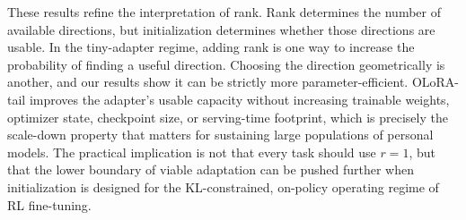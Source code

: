 \documentclass{llmxive}
\begin{document}
  These results refine the interpretation of rank.
  Rank determines the number of available directions, but initialization determines whether
  those directions are usable.
  In the tiny-adapter regime, adding rank is one way to increase the probability of finding
  a useful direction. Choosing the direction geometrically is another, and our results show
  it can be strictly more parameter-efficient.
  OLoRA-tail improves the adapter's usable capacity without increasing trainable weights,
  optimizer state, checkpoint size, or serving-time footprint, which is precisely the
  scale-down property that matters for sustaining large populations of personal models.
  The practical implication is not that every task should use $r{=}1$, but that the lower
  boundary of viable adaptation can be pushed further when initialization is designed for
  the KL-constrained, on-policy operating regime of RL fine-tuning.


\end{document}
